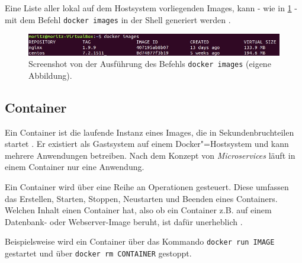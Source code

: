 \documentclass[../main.tex]{subfiles}
\begin{document}
			Eine Liste aller lokal auf dem Hostsystem vorliegenden Images, kann - wie in \fig \ref{fig:intro_dockerImages} - mit dem Befehl \texttt{docker images} in der Shell generiert werden \cite{dockerImages}.

			\begin{figure}[!htbp]
          \centering
          \includegraphics[width=1.0\textwidth]{./images/intro_dockerImages.jpg}
          \caption{Screenshot von der Ausführung des Befehls \texttt{docker images} (eigene Abbildung).}
          \label{fig:intro_dockerImages}
      \end{figure}



    \subsection{Container}
		\label{dockerContainer}
			Ein Container ist die laufende Instanz eines Images, die in Sekundenbruchteilen startet \cite[S.1]{dockerIntroIEEE}. Er existiert als Gastsystem auf einem Docker"=Hostsystem und kann mehrere Anwendungen betreiben. Nach dem Konzept von \emph{Microservices} läuft in einem Container nur eine Anwendung.

      Ein Container wird über eine Reihe an Operationen gesteuert. Diese umfassen das Erstellen, Starten, Stoppen, Neustarten und Beenden eines Containers. Welchen Inhalt einen Container hat, also ob ein Container z.B. auf einem Datenbank- oder Webserver-Image beruht, ist dafür unerheblich \cite[S.12]{dockerBook}\cite[S.2]{dockerLXCKub}.

			Beispielsweise wird ein Container über das Kommando \texttt{docker run IMAGE} gestartet und über \texttt{docker rm CONTAINER} gestoppt.
\end{document}
